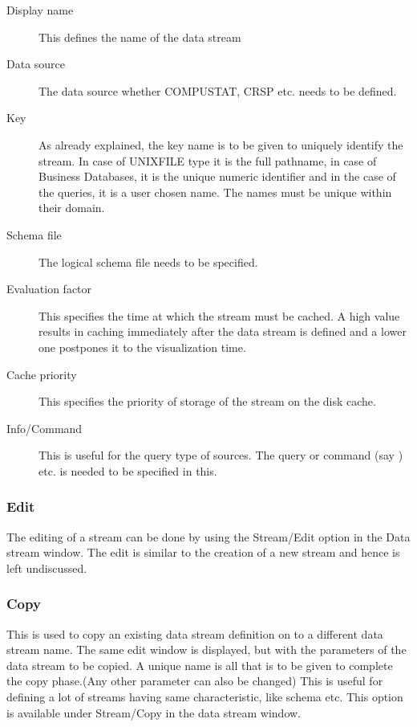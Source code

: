 \begin{description}
\item[Display name] This defines the name of the data stream
\item[Data source] The data source whether COMPUSTAT, CRSP etc. needs
to be defined.
\item[Key] As already explained, the key name is to be given to
uniquely identify the stream. In case of UNIXFILE type it is the full
pathname, in case of Business Databases, it is the unique numeric
identifier and in the case of the queries, it is a user chosen
name. The names must be unique within their domain.
\item[Schema file] The logical schema file needs to be specified.
\item[Evaluation factor] This specifies the time at which the stream
must be cached. A high value results in caching immediately after the
data stream is defined and a lower one postpones it to the
visualization time.
\item[Cache priority] This specifies the priority of storage of the
stream on the disk cache.
\item[Info/Command] This is useful for the query type of sources. The
query or command (say ) etc. is needed to be
specified in this.
\end{description}


\subsubsection{Edit}

The editing of a stream can be done by using the Stream/Edit option in the Data
stream window. The edit is similar to the creation of a new stream and hence is
left undiscussed.

\subsubsection{Copy}

This is used to copy an existing data stream definition on to a different data
stream name. The same edit window is displayed, but with the parameters of the
data stream to be copied. A unique name is all that is to be given to complete
the copy phase.(Any other parameter can also be changed) This is useful for
defining a lot of streams having same characteristic, like schema etc. This
option is available under Stream/Copy in the data stream window.

